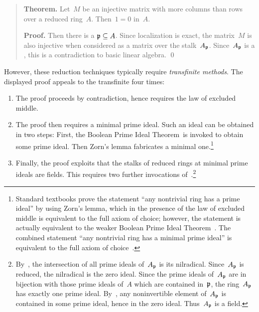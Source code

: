 \documentclass{ws-rv9x6}
\begin{document}
{\begin{quote}
\textbf{Theorem.} Let~$M$ be an injective matrix with more columns than rows
over a reduced ring~$A$. Then~$1 = 0$ in~$A$.

\textbf{Proof.}  Then there is a  $\mathfrak{p} \subseteq A$. Since localization is exact, the matrix~$M$ is also injective when
considered as a matrix over the stalk~$A_{\mathfrak{p}}$. Since~$A_{\mathfrak{p}}$ is a
, this is a contradiction to basic linear algebra. \qed
\end{quote}

However, these reduction techniques typically require \emph{transfinite
methods}. The displayed proof appeals to the transfinite four times:
\begin{enumerate}
\item The proof proceeds by contradiction, hence requires the law of excluded
middle.  %
\item The proof then requires a minimal prime ideal. Such an ideal can be
obtained in two steps: First, the Boolean Prime Ideal
Theorem~\BPIT is invoked to obtain some prime ideal. Then
Zorn's lemma fabricates a minimal one.\footnote{Standard textbooks prove the statement ``any nontrivial
ring has a prime ideal'' by using Zorn's lemma, which
in the presence of the law of excluded middle is equivalent to the full axiom
of choice; however, the statement is actually equivalent to the weaker Boolean
Prime Ideal Theorem~\cite{scott:bpit,banaschewski-harting:lattice-aspects}.
The combined statement ``any nontrivial ring has a minimal prime ideal'' is equivalent to
the full axiom of choice~\cite{savin:minimal-prime-ideals}.}
\item Finally, the proof exploits that the stalks of reduced rings at minimal
prime ideals are fields. This requires two further invocations
of~\BPIT.\footnote{By~\BPIT, the intersection of all prime ideals of~$A_{\mathfrak{p}}$
is its nilradical. Since~$A_{\mathfrak{p}}$ is reduced, the nilradical is the zero ideal.
Since the prime ideals of~$A_{\mathfrak{p}}$ are in bijection with those prime ideals
of~$A$ which are contained in~$\mathfrak{p}$, the ring~$A_{\mathfrak{p}}$ has exactly one prime
ideal. By~\BPIT, any noninvertible element of~$A_{\mathfrak{p}}$ is contained in some
prime ideal, hence in the zero ideal. Thus~$A_{\mathfrak{p}}$ is a field.}
\end{enumerate}

}
\end{document}
